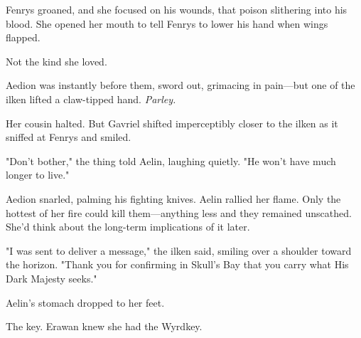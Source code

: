 Fenrys groaned, and she focused on his wounds, that poison slithering into his blood.
She opened her mouth to tell Fenrys to lower his hand when wings flapped.

Not the kind she loved.

Aedion was instantly before them, sword out, grimacing in pain---but one of the ilken lifted a claw-tipped hand.
\emph{Parley.}

Her cousin halted.
But Gavriel shifted imperceptibly closer to the ilken as it sniffed at Fenrys and smiled.

"Don't bother," the thing told Aelin, laughing quietly.
"He won't have much longer to live."

Aedion snarled, palming his fighting knives.
Aelin rallied her flame.
Only the hottest of her fire could kill them---anything less and they remained unscathed.
She'd think about the long-term implications of it later.

"I was sent to deliver a message," the ilken said, smiling over a shoulder toward the horizon.
"Thank you for confirming in Skull's Bay that you carry what His Dark Majesty seeks."

Aelin's stomach dropped to her feet.

The key.
Erawan knew she had the Wyrdkey.
